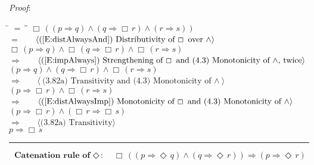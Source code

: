 \documentclass[12pt, fleqn, leqno]{article}
\newcommand{\lgap}{2pt}                             %
\newcommand{\mymathindent}{24pt}                    %
\newcommand{\impl}{\ensuremath{\Rightarrow}}        %
\newcommand{\Event}{\Diamond\,}
\newcommand{\Always}{\Box\,}
\newcommand{\myqed}{\rule[-.23ex]{1.2ex}{2.0ex}}
\newcommand{\myqedtab}{\hspace{384pt}}              %
\newcommand{\Gll} {\langle}                         %
\newcommand{\Ggg} {\rangle}                         %
\newcommand{\Hint}[1]     {\ \ \ $\Gll              \mbox{#1} \Ggg$ }   %
\begin{document}
\emph{Proof}:
\begin{tabbing}
\hspace{\mymathindent} \= $= \;$ \= \myqedtab \= \kill
  \> \>   $\Always ( (p \impl q) \land (q \impl \Always r) \land (r \impl s))$\\[\lgap]
   \> $=$  \>  \Hint{(\ref{E:distAlwaysAnd}) Distributivity of $\Always$ over $\land$}\\[\lgap]
  \> \>   $\Always ( p \impl q) \land \Always (q \impl \Always r) \land \Always (r \impl s)$\\[\lgap]
   \> $\impl$  \>  \Hint{(\ref{E:impAlways}) Strengthening of $\Always$ and (4.3) Monotonicity of $\land$, twice}\\[\lgap]
    \> \>   $ (p \impl q) \land (q \impl \Always r) \land \Always (r \impl s)$\\[\lgap]
    \> $\impl$  \>  \Hint{(3.82a) Transitivity and (4.3) Monotonicity of $\land$}\\[\lgap]
     \> \>   $ (p \impl \Always r) \land \Always (r \impl s)$\\[\lgap]
     \> $\impl$ \> \Hint{(\ref{E:distAlwaysImp}) Monotonicity of $\Always$ and (4.3) Monotonicity of $\land$} \\[\lgap]
  \> \>   $ (p \impl \Always r) \land (\Always r \impl \Always s)$\\[\lgap]
  \> $\impl$  \>  \Hint{(3.82a) Transitivity}\\[\lgap]
  \> \>   $ p \impl \Always s$\quad \myqed
\end{tabbing}
\begin{equation}\label{E:EventCatRule}
\textbf{Catenation rule of $\Event$:}\quad \Always ( (p \impl \Event q) \land (q \impl \Event r)) \impl (p \impl \Event r)
\end{equation}
\end{document}
